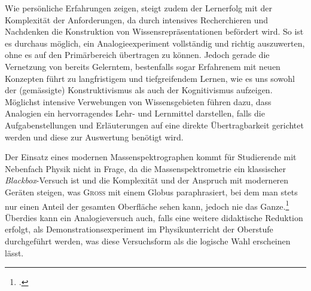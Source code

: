 Wie persönliche Erfahrungen zeigen, steigt zudem der Lernerfolg mit der Komplexität der Anforderungen, da durch intensives Recherchieren und Nachdenken die Konstruktion von Wissensrepräsentationen befördert wird. So ist es durchaus möglich, ein Analogieexperiment vollständig und richtig auszuwerten, ohne es auf den Primärbereich übertragen zu können. Jedoch gerade die Vernetzung von bereits Gelerntem, bestenfalls sogar Erfahrenem mit neuen Konzepten führt zu langfristigem und tiefgreifendem Lernen, wie es uns sowohl der (gemässigte) Konstruktivismus als auch der Kognitivismus aufzeigen. Möglichst intensive Verwebungen von Wissensgebieten führen dazu, dass Analogien ein hervorragendes Lehr- und Lernmittel darstellen, falls die Aufgabenstellungen und Erläuterungen auf eine direkte Übertragbarkeit gerichtet werden und diese zur Auswertung benötigt wird. \par Der Einsatz eines modernen Massenspektrographen kommt für Studierende mit Nebenfach Physik nicht in Frage, da die Massenspektrometrie ein klassischer \textit{Blackbox}-Versuch ist und die Komplexität und der Anspruch mit moderneren Geräten steigen, was \textsc{Gross} mit einem Globus paraphrasiert, bei dem man stets nur einen Anteil der gesamten Oberfläche sehen kann, jedoch nie das Ganze.\footcite[vgl.][S.\,6]{Gross2012}  Überdies kann ein Analogieversuch auch, falls eine weitere didaktische Reduktion erfolgt, als Demonstrationsexperiment im Physikunterricht der Oberstufe durchgeführt werden, was diese Versuchsform als die logische Wahl erscheinen lässt.

